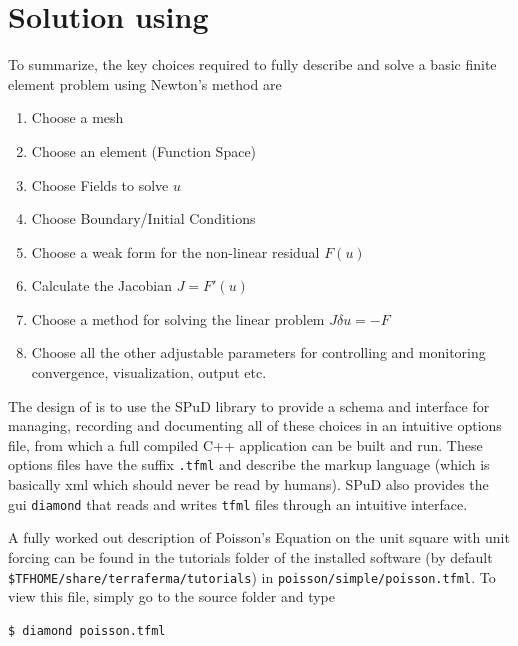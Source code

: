 \documentclass[10pt,twoside,openright]{memoir}
\begin{document}
\section{Solution using \TF}
\label{sec:solution-using-tf}

To summarize,  the key choices required to fully describe and solve a
basic finite element problem using Newton's method are
\begin{enumerate}
\setlength{\itemsep}{0cm}
\item Choose a mesh
\item Choose an element (Function Space)
\item Choose Fields to solve $u$
\item Choose Boundary/Initial Conditions
\item Choose a weak form for the non-linear residual $F(u)$
\item Calculate the Jacobian $J=F'(u)$
\item Choose a method for solving the linear problem $J\delta u = -F$
\item Choose all the other adjustable parameters for controlling and
  monitoring convergence, visualization, output etc.
\end{enumerate}

The design of \TF{} is to use the SPuD library to provide a schema and interface
for managing, recording and documenting all of these choices in an
intuitive options file, from which a full compiled C++ application can
be built and run.  These options files have the suffix \texttt{.tfml}
and describe the \TF{} markup language (which is basically xml which
should never be read by humans).  SPuD also provides the gui
\texttt{diamond} that reads and writes \texttt{tfml} files through an
intuitive interface.  

A fully worked out description of Poisson's Equation on the unit
square with unit forcing can be found in the tutorials folder of the
installed software (by default
\texttt{\${TFHOME}/share/terraferma/tutorials}) in
\texttt{poisson/simple/poisson.tfml}.  To view this file, simply go to
the source folder and type
\begin{lstlisting}[style=Bash]
$ diamond poisson.tfml
\end{lstlisting}
\end{document}
